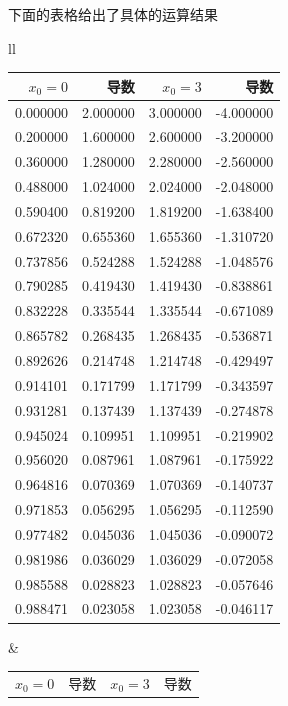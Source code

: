 \documentclass[12pt]{article}
\numberwithin{figure}{section}
\newenvironment{fullmodel}{
			\smallskip\noindent
			\begin{minipage}{\textwidth+\marginparwidth+\marginparsep}\smallskip\smallskip}
			{\smallskip\smallskip\end{minipage}\vspace{.1in}
			}
\numberwithin{equation}{section}
\begin{document}
\begin{fullmodel}
下面的表格给出了具体的运算结果
	\begin{table}[H]
		\centering
		\begin{tabular}{ll}
		\begin{tabular}{rrrr}
\toprule
  $x_0=0$ &  导数 &   $x_0=3$ &  导数 \\
\midrule
 0.000000 &     2.000000 &  3.000000 &     -4.000000 \\
 0.200000 &     1.600000 &  2.600000 &     -3.200000 \\
 0.360000 &     1.280000 &  2.280000 &     -2.560000 \\
 0.488000 &     1.024000 &  2.024000 &     -2.048000 \\
 0.590400 &     0.819200 &  1.819200 &     -1.638400 \\
 0.672320 &     0.655360 &  1.655360 &     -1.310720 \\
 0.737856 &     0.524288 &  1.524288 &     -1.048576 \\
 0.790285 &     0.419430 &  1.419430 &     -0.838861 \\
 0.832228 &     0.335544 &  1.335544 &     -0.671089 \\
 0.865782 &     0.268435 &  1.268435 &     -0.536871 \\
 0.892626 &     0.214748 &  1.214748 &     -0.429497 \\
 0.914101 &     0.171799 &  1.171799 &     -0.343597 \\
 0.931281 &     0.137439 &  1.137439 &     -0.274878 \\
 0.945024 &     0.109951 &  1.109951 &     -0.219902 \\
 0.956020 &     0.087961 &  1.087961 &     -0.175922 \\
 0.964816 &     0.070369 &  1.070369 &     -0.140737 \\
 0.971853 &     0.056295 &  1.056295 &     -0.112590 \\
 0.977482 &     0.045036 &  1.045036 &     -0.090072 \\
 0.981986 &     0.036029 &  1.036029 &     -0.072058 \\
 0.985588 &     0.028823 &  1.028823 &     -0.057646 \\
 0.988471 &     0.023058 &  1.023058 &     -0.046117 \\
\bottomrule
\end{tabular} & 
\begin{tabular}{rrrr}
\toprule
   $x_0=0$ &  导数 &   $x_0=3$ &  导数 \\

\end{tabular}
\end{tabular}
\end{table}
\end{fullmodel}
\end{document}
